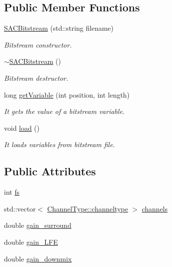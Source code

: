 \subsection*{Public Member Functions}
\begin{DoxyCompactItemize}
\item 
\mbox{\label{class_s_a_c_bitstream_a46fe059e932c2e72d07b4dbf982e6533}} 
\hyperlink{class_s_a_c_bitstream_a46fe059e932c2e72d07b4dbf982e6533}{S\+A\+C\+Bitstream} (std\+::string filename)
\begin{DoxyCompactList}\small\item\em Bitstream constructor. \end{DoxyCompactList}\item 
\mbox{\label{class_s_a_c_bitstream_a4a416e485fb3a14a7bafb0a5542d7945}} 
\hyperlink{class_s_a_c_bitstream_a4a416e485fb3a14a7bafb0a5542d7945}{$\sim$\+S\+A\+C\+Bitstream} ()
\begin{DoxyCompactList}\small\item\em Bitstream destructor. \end{DoxyCompactList}\item 
long \hyperlink{class_s_a_c_bitstream_ad0f39852ca2853efa15be087ce68c3b9}{get\+Variable} (int position, int length)
\begin{DoxyCompactList}\small\item\em It gets the value of a bitstream variable. \end{DoxyCompactList}\item 
\mbox{\label{class_s_a_c_bitstream_a3113cb4df7e64416b156c4f1d9564a4e}} 
void \hyperlink{class_s_a_c_bitstream_a3113cb4df7e64416b156c4f1d9564a4e}{load} ()
\begin{DoxyCompactList}\small\item\em It loads variables from bitstream file. \end{DoxyCompactList}\end{DoxyCompactItemize}
\subsection*{Public Attributes}
\begin{DoxyCompactItemize}
\item 
int \hyperlink{class_s_a_c_bitstream_a94931a9831b06bba488d4f7b6f1e5744}{fs}
\item 
std\+::vector$<$ \hyperlink{struct_s_a_c_bitstream_1_1_channel_type_a31c32b34085c06a1c58d920ca28c17c9}{Channel\+Type\+::channeltype} $>$ \hyperlink{class_s_a_c_bitstream_a385f676be794f5bb9bec896ef6eda43c}{channels}
\item 
double \hyperlink{class_s_a_c_bitstream_acf9019de0f79c54aae0ffa29a57c3194}{gain\+\_\+surround}
\item 
double \hyperlink{class_s_a_c_bitstream_a4edc51fec93b93461156d8fa376e0116}{gain\+\_\+\+L\+FE}
\item 
double \hyperlink{class_s_a_c_bitstream_a2f4bba870168dd984a7ed4d5214024ed}{gain\+\_\+downmix}
\end{DoxyCompactItemize}


